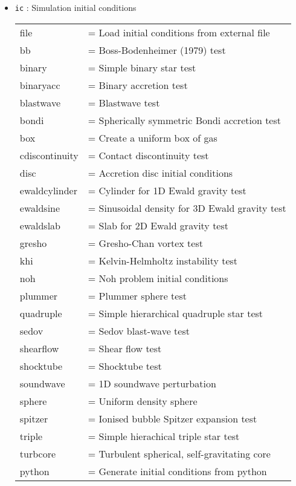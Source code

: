 \documentclass[a4paper]{article}
\newcommand{\var}[1]{\texttt{#1}}
\begin{document}
\begin{itemize}
\item \var{ic} : Simulation initial conditions \vspace{0.1cm} \\
\begin{tabular}{ll}
file              & = Load initial conditions from external file \\
bb                & = Boss-Bodenheimer (1979) test \\
binary            & = Simple binary star test \\
binaryacc         & = Binary accretion test \\
blastwave         & = Blastwave test \\
bondi             & = Spherically symmetric Bondi accretion test \\
box               & = Create a uniform box of gas \\
cdiscontinuity    & = Contact discontinuity test \\
disc					& = Accretion disc initial conditions \\
ewaldcylinder     & = Cylinder for 1D Ewald gravity test \\
ewaldsine         & = Sinusoidal density for 3D Ewald gravity test \\
ewaldslab         & = Slab for 2D Ewald gravity test \\
gresho            & = Gresho-Chan vortex test \\
khi               & = Kelvin-Helmholtz instability test \\
noh               & = Noh problem initial conditions \\
plummer           & = Plummer sphere test \\
quadruple         & = Simple hierarchical quadruple star test \\
sedov             & = Sedov blast-wave test \\
shearflow         & = Shear flow test \\
shocktube         & = Shocktube test \\
soundwave         & = 1D soundwave perturbation \\
sphere            & = Uniform density sphere \\
spitzer           & = Ionised bubble Spitzer expansion test \\
triple            & = Simple hierachical triple star test \\
turbcore          & = Turbulent spherical, self-gravitating core \\
python            & = Generate initial conditions from python
\end{tabular}


\end{itemize}
\end{document}
